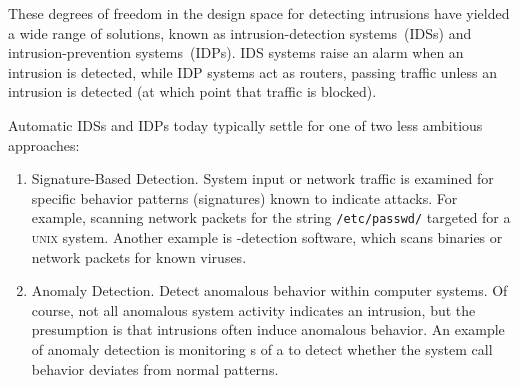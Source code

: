 These degrees of freedom in the design space for detecting intrusions have yielded a wide range of solutions, known as intrusion-detection systems~(IDSs) and intrusion-prevention systems~(IDPs).
IDS systems raise an alarm when an intrusion is detected, while IDP systems act as routers, passing traffic unless an intrusion is detected (at which point that traffic is blocked).

Automatic IDSs and IDPs today typically settle for one of two less ambitious approaches:
\begin{enumerate}[noitemsep]
\item Signature-Based Detection.
  System input or network traffic is examined for specific behavior patterns (signatures) known to indicate attacks.
  For example, scanning network packets for the string \texttt{/etc/passwd/} targeted for a \textsc{unix} system.
  Another example is -detection software, which scans binaries or network packets for known viruses.
\item Anomaly Detection.
  Detect anomalous behavior within computer systems.
  Of course, not all anomalous system activity indicates an intrusion, but the presumption is that intrusions often induce anomalous behavior.
  An example of anomaly detection is monitoring s of a   to detect whether the system call behavior deviates from normal patterns.
\end{enumerate}


